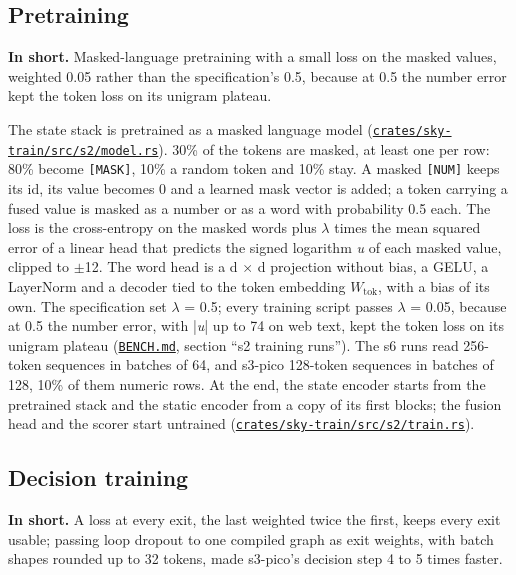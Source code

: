 \documentclass[10pt]{article}
\begin{document}
\subsection{Pretraining}\label{sec:4.2}

\textbf{In short.} Masked-language pretraining with a small loss on the masked values, weighted 0.05 rather than the specification's 0.5, because at 0.5 the number error kept the token loss on its unigram plateau.

The state stack is pretrained as a masked language model (\href{https://github.com/maxgfr/skycmd/blob/main/crates/sky-train/src/s2/model.rs}{\texttt{crates/\allowbreak{}sky-train/\allowbreak{}src/\allowbreak{}s2/\allowbreak{}model.rs}}). 30\% of the tokens are masked, at least one per row: 80\% become \texttt{[MASK]}, 10\% a random token and 10\% stay. A masked \texttt{[NUM]} keeps its id, its value becomes 0 and a learned mask vector is added; a token carrying a fused value is masked as a number or as a word with probability 0.5 each. The loss is the cross-entropy on the masked words plus $\lambda$ times the mean squared error of a linear head that predicts the signed logarithm \emph{u} of each masked value, clipped to $\pm$12. The word head is a d $\times$ d projection without bias, a GELU, a LayerNorm and a decoder tied to the token embedding $W_{\mathrm{tok}}$, with a bias of its own. The specification set $\lambda$ = 0.5; every training script passes $\lambda$ = 0.05, because at 0.5 the number error, with |\emph{u}| up to 74 on web text, kept the token loss on its unigram plateau (\href{https://github.com/maxgfr/skycmd/blob/main/BENCH.md}{\texttt{BENCH.md}}, section ``s2 training runs''). The s6 runs read 256-token sequences in batches of 64, and s3-pico 128-token sequences in batches of 128, 10\% of them numeric rows. At the end, the state encoder starts from the pretrained stack and the static encoder from a copy of its first blocks; the fusion head and the scorer start untrained (\href{https://github.com/maxgfr/skycmd/blob/main/crates/sky-train/src/s2/train.rs}{\texttt{crates/\allowbreak{}sky-train/\allowbreak{}src/\allowbreak{}s2/\allowbreak{}train.rs}}).

\subsection{Decision training}\label{sec:4.3}

\textbf{In short.} A loss at every exit, the last weighted twice the first, keeps every exit usable; passing loop dropout to one compiled graph as exit weights, with batch shapes rounded up to 32 tokens, made s3-pico's decision step 4 to 5 times faster.
\end{document}
